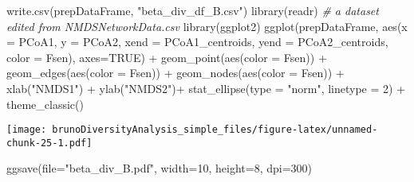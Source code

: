 \documentclass[
]{article}
\newenvironment{Shaded}{\begin{snugshade}}{\end{snugshade}}
\newcommand{\AttributeTok}[1]{\textcolor[rgb]{0.77,0.63,0.00}{#1}}
\newcommand{\CommentTok}[1]{\textcolor[rgb]{0.56,0.35,0.01}{\textit{#1}}}
\newcommand{\ConstantTok}[1]{\textcolor[rgb]{0.00,0.00,0.00}{#1}}
\newcommand{\DecValTok}[1]{\textcolor[rgb]{0.00,0.00,0.81}{#1}}
\newcommand{\FunctionTok}[1]{\textcolor[rgb]{0.00,0.00,0.00}{#1}}
\newcommand{\NormalTok}[1]{#1}
\newcommand{\SpecialCharTok}[1]{\textcolor[rgb]{0.00,0.00,0.00}{#1}}
\newcommand{\StringTok}[1]{\textcolor[rgb]{0.31,0.60,0.02}{#1}}
\begin{document}
\begin{Shaded}
\begin{Highlighting}[]
\FunctionTok{write.csv}\NormalTok{(prepDataFrame, }\StringTok{"beta\_div\_df\_B.csv"}\NormalTok{)}
\FunctionTok{library}\NormalTok{(readr)}
\CommentTok{\# a dataset edited from NMDSNetworkData.csv}
\FunctionTok{library}\NormalTok{(ggplot2)}
\FunctionTok{ggplot}\NormalTok{(prepDataFrame, }\FunctionTok{aes}\NormalTok{(}\AttributeTok{x =}\NormalTok{ PCoA1, }\AttributeTok{y =}\NormalTok{ PCoA2, }\AttributeTok{xend =}\NormalTok{ PCoA1\_centroids, }\AttributeTok{yend =}\NormalTok{ PCoA2\_centroids, }\AttributeTok{color =}\NormalTok{ Fsen), }\AttributeTok{axes=}\ConstantTok{TRUE}\NormalTok{) }\SpecialCharTok{+}
  \FunctionTok{geom\_point}\NormalTok{(}\FunctionTok{aes}\NormalTok{(}\AttributeTok{color =}\NormalTok{ Fsen)) }\SpecialCharTok{+}
  \FunctionTok{geom\_edges}\NormalTok{(}\FunctionTok{aes}\NormalTok{(}\AttributeTok{color =}\NormalTok{ Fsen)) }\SpecialCharTok{+}
  \FunctionTok{geom\_nodes}\NormalTok{(}\FunctionTok{aes}\NormalTok{(}\AttributeTok{color =}\NormalTok{ Fsen)) }\SpecialCharTok{+}
  \FunctionTok{xlab}\NormalTok{(}\StringTok{"NMDS1"}\NormalTok{) }\SpecialCharTok{+}
  \FunctionTok{ylab}\NormalTok{(}\StringTok{"NMDS2"}\NormalTok{)}\SpecialCharTok{+}
  \FunctionTok{stat\_ellipse}\NormalTok{(}\AttributeTok{type =} \StringTok{"norm"}\NormalTok{, }\AttributeTok{linetype =} \DecValTok{2}\NormalTok{) }\SpecialCharTok{+}
  \FunctionTok{theme\_classic}\NormalTok{()}
\end{Highlighting}
\end{Shaded}

\texttt{[image: brunoDiversityAnalysis\_simple\_files/figure-latex/unnamed-chunk-25-1.pdf]}

\begin{Shaded}
\begin{Highlighting}[]
\FunctionTok{ggsave}\NormalTok{(}\AttributeTok{file=}\StringTok{"beta\_div\_B.pdf"}\NormalTok{, }\AttributeTok{width=}\DecValTok{10}\NormalTok{, }\AttributeTok{height=}\DecValTok{8}\NormalTok{, }\AttributeTok{dpi=}\DecValTok{300}\NormalTok{)}
\end{Highlighting}
\end{Shaded}
\end{document}
